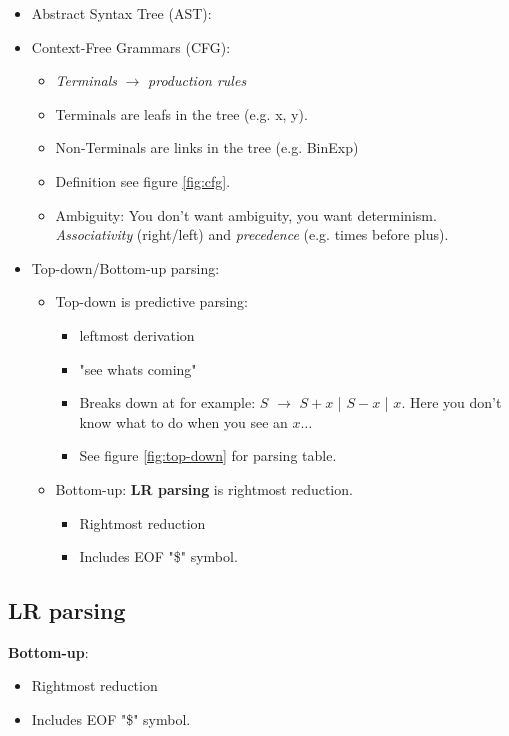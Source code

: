 \begin{itemize}
    \item Abstract Syntax Tree (AST): 
    \item Context-Free Grammars (CFG): 
    \begin{itemize}
        \item \textit{Terminals} $\rightarrow$ \textit{production rules}
        \item Terminals are leafs in the tree (e.g. x, y).
        \item Non-Terminals are links in the tree (e.g. BinExp)
        \item Definition see figure \ref{fig:cfg}.
        \item Ambiguity: You don't want ambiguity, you want determinism. \textit{Associativity} (right/left) and \textit{precedence} (e.g. times before plus).
    \end{itemize}
    \item Top-down/Bottom-up parsing:
    \begin{itemize}
        \item Top-down is predictive parsing:
        \begin{itemize}
            \item leftmost derivation
            \item "see whats coming"
            \item Breaks down at for example: $S$ $\rightarrow$ $S+x$ | $S-x$ | $x$. Here you don't know what to do when you see an $x\dots$
            \item See figure \ref{fig:top-down} for parsing table.
        \end{itemize}
        \item Bottom-up: \textbf{LR parsing} is rightmost reduction.
        \begin{itemize}
            \item Rightmost reduction
            \item Includes EOF "\$" symbol.
        \end{itemize}
    \end{itemize}
\end{itemize}

\subsection{LR parsing}

\textbf{Bottom-up}:
\begin{itemize}
    \item Rightmost reduction
    \item Includes EOF "\$" symbol.
\end{itemize}

